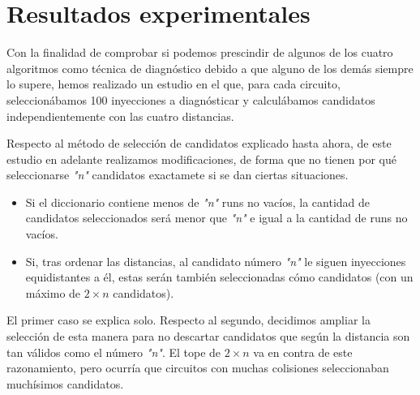 \section{Resultados experimentales}
\label{sec:4Results}
Con la finalidad de comprobar si podemos prescindir de algunos de los cuatro
algoritmos como técnica de diagnóstico debido a que alguno de los demás siempre lo
supere, hemos realizado un estudio en el que, para cada circuito, seleccionábamos
100 inyecciones a diagnósticar y calculábamos candidatos independientemente con
las cuatro distancias.

Respecto al método de selección de candidatos explicado hasta ahora, de este
estudio en adelante realizamos modificaciones, de forma que no tienen por qué
seleccionarse \textit{"n"} candidatos exactamete si se dan ciertas situaciones.
\begin{itemize}
    \item Si el diccionario contiene menos de \textit{"n"} runs no vacíos, la
        cantidad de candidatos seleccionados será menor que \textit{"n"} e igual
        a la cantidad de runs no vacíos.
    \item Si, tras ordenar las distancias, al candidato número \textit{"n"} le
        siguen inyecciones equidistantes a él, estas serán también seleccionadas
        cómo candidatos (con un máximo de $2 \times n$ candidatos).
\end{itemize}

El primer caso se explica solo. Respecto al segundo, decidimos ampliar la
selección de esta manera para no descartar candidatos que según la distancia son
tan válidos como el número \textit{"n"}. El tope de $2 \times n$ va en contra de
este razonamiento, pero ocurría que circuitos con muchas colisiones seleccionaban
muchísimos candidatos.

